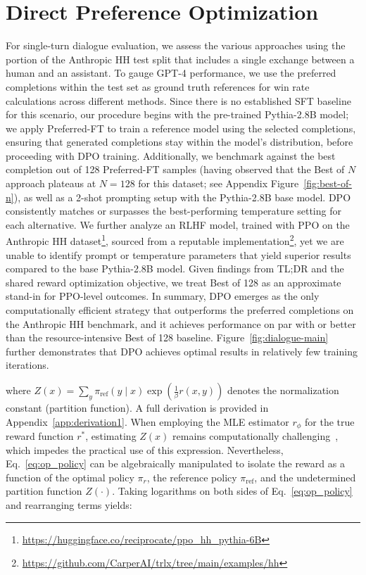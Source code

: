 \section{Direct Preference Optimization}\label{sec:DPO}

For single-turn dialogue evaluation, we assess the various approaches using the portion of the Anthropic HH test split \citep{bai2022training} that includes a single exchange between a human and an assistant. To gauge GPT-4 performance, we use the preferred completions within the test set as ground truth references for win rate calculations across different methods. Since there is no established SFT baseline for this scenario, our procedure begins with the pre-trained Pythia-2.8B model; we apply Preferred-FT to train a reference model using the selected completions, ensuring that generated completions stay within the model’s distribution, before proceeding with DPO training. Additionally, we benchmark against the best completion out of 128 Preferred-FT samples (having observed that the Best of $N$ approach plateaus at $N=128$ for this dataset; see Appendix Figure~\ref{fig:best-of-n}), as well as a 2-shot prompting setup with the Pythia-2.8B base model. DPO consistently matches or surpasses the best-performing temperature setting for each alternative. We further analyze an RLHF model, trained with PPO on the Anthropic HH dataset\footnote{\url{https://huggingface.co/reciprocate/ppo_hh_pythia-6B}}, sourced from a reputable implementation\footnote{\url{https://github.com/CarperAI/trlx/tree/main/examples/hh}}, yet we are unable to identify prompt or temperature parameters that yield superior results compared to the base Pythia-2.8B model. Given findings from TL;DR and the shared reward optimization objective, we treat Best of 128 as an approximate stand-in for PPO-level outcomes. In summary, DPO emerges as the only computationally efficient strategy that outperforms the preferred completions on the Anthropic HH benchmark, and it achieves performance on par with or better than the resource-intensive Best of 128 baseline. Figure~\ref{fig:dialogue-main} further demonstrates that DPO achieves optimal results in relatively few training iterations.

where $Z(x) =\sum_{y}\pi_\text{ref}(y\mid x)\exp\left(\frac{1}{\beta}r(x, y)\right)$ denotes the normalization constant (partition function). A full derivation is provided in Appendix~\ref{app:derivation1}. When employing the MLE estimator $r_\phi$ for the true reward function $r^*$, estimating $Z(x)$ remains computationally challenging~\citep{korbak2022reinforcement, go2023aligning}, which impedes the practical use of this expression. Nevertheless, Eq.~\ref{eq:op_policy} can be algebraically manipulated to isolate the reward as a function of the optimal policy $\pi_r$, the reference policy $\pi_\text{ref}$, and the undetermined partition function $Z(\cdot)$. Taking logarithms on both sides of Eq.~\ref{eq:op_policy} and rearranging terms yields:


